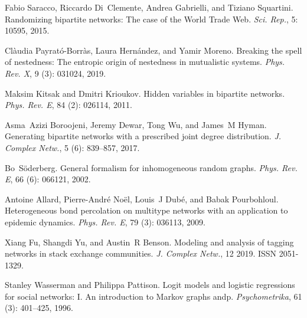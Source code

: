 Fabio Saracco, Riccardo Di~Clemente, Andrea Gabrielli, and Tiziano Squartini.
\newblock Randomizing bipartite networks: The case of the {{World Trade Web}}.
\newblock \emph{Sci. Rep.}, 5: 10595, 2015.

Cl{\`a}udia Payrat{\'o}-Borr{\`a}s, Laura Hern{\'a}ndez, and Yamir Moreno.
\newblock Breaking the spell of nestedness: The entropic origin of nestedness
in mutualistic systems.
\newblock \emph{Phys. Rev. X}, 9 (3): 031024, 2019.

Maksim Kitsak and Dmitri Krioukov.
\newblock Hidden variables in bipartite networks.
\newblock \emph{Phys. Rev. E}, 84 (2): 026114, 2011.

Asma~Azizi Boroojeni, Jeremy Dewar, Tong Wu, and James~M Hyman.
\newblock Generating bipartite networks with a prescribed joint degree
distribution.
\newblock \emph{J. Complex Netw.}, 5 (6): 839--857, 2017.

Bo~S{\"o}derberg.
\newblock General formalism for inhomogeneous random graphs.
\newblock \emph{Phys. Rev. E}, 66 (6): 066121, 2002.

Antoine Allard, Pierre-Andr{\'e} No{\"e}l, Louis~J Dub{\'e}, and Babak
Pourbohloul.
\newblock Heterogeneous bond percolation on multitype networks with an
application to epidemic dynamics.
\newblock \emph{Phys. Rev. E}, 79 (3): 036113, 2009.

Xiang Fu, Shangdi Yu, and Austin~R Benson.
\newblock Modeling and analysis of tagging networks in stack exchange
communities.
\newblock \emph{J. Complex Netw.}, 12 2019.
\newblock ISSN 2051-1329.

Stanley Wasserman and Philippa Pattison.
\newblock Logit models and logistic regressions for social networks: {{I}}.
{{An}} introduction to {{Markov}} graphs andp.
\newblock \emph{Psychometrika}, 61 (3): 401--425, 1996.

